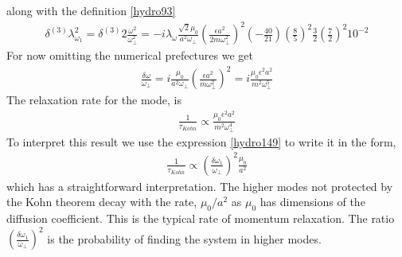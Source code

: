 along with the definition \eqref{hydro93}
\begin{align}
\delta^{(3)} \lambda_{\omega_1}^2 = 
\delta^{(3)} 2 \frac{\omega^2}{ \omega_{\perp}^2} =
- i \lambda_{\omega} \frac{\sqrt{2} \mu_0 }{ a^2 \omega_{\perp}} \left(\frac{\epsilon a^2 }{2 m \omega_{\perp}^2}\right)^2 ( - \frac{40}{21}) \left(\frac{8}{5}\right)^2 \frac{3}{2} (\frac{7}{2})^2 10^{-2}
\end{align}
For now omitting the numerical prefectures we get
\begin{align}
\frac{\delta \omega}{\omega_{\perp}} = i \frac{\mu_0 }{ a^2 \omega_{\perp}} 
\left(\frac{\epsilon a^2 }{ m \omega_{\perp}^2}\right)^2 
= i \frac{ \mu_0 \epsilon^2 a^2 }{m^2 \omega_{\perp}^5}
\end{align}
The relaxation rate for the mode,
is 
\begin{align}
\boxed{\frac{1}{\tau_{Kohn}} \propto \frac{ \mu_0 \epsilon^2 a^2 }{m^2 \omega_{\perp}^4}}
\end{align}
To interpret this result we use the expression \eqref{hydro149} to write it in the form,
\begin{align}\label{res_life}
\boxed{\frac{1}{\tau_{Kohn}} \propto \left(\frac{ \delta \omega_1}{\omega_{\perp}} \right)^2 \frac{\mu_0}{a^2}}
\end{align}
which has a straightforward interpretation.
The higher modes not protected by the Kohn theorem decay with the rate,
$ \mu_0 / a^2 $ as $\mu_0$ has dimensions of the diffusion coefficient.
This is the typical rate of momentum relaxation. 
The ratio  $\left(\frac{ \delta \omega_1}{\omega_{\perp}} \right)^2$ is the probability of finding the system in higher modes.

